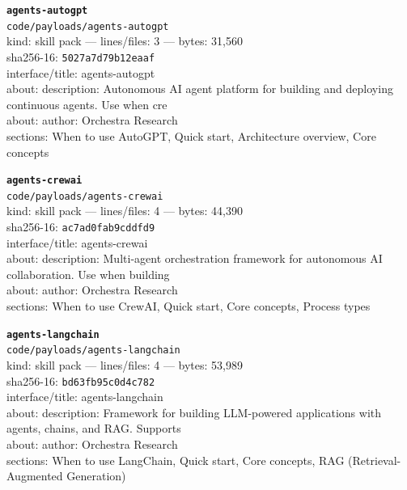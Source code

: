 \noindent\textbf{\texttt{agents-autogpt}}\\
\texttt{code/payloads/agents-autogpt}\\
kind: skill pack --- lines/files: 3 --- bytes: 31,560\\
sha256-16: \texttt{5027a7d79b12eaaf}\\
interface/title: agents-autogpt\\
about: description: Autonomous AI agent platform for building and deploying continuous agents. Use when cre\\
about: author: Orchestra Research\\
sections: When to use AutoGPT, Quick start, Architecture overview, Core concepts\\
\vspace*{6.0pt}

\noindent\textbf{\texttt{agents-crewai}}\\
\texttt{code/payloads/agents-crewai}\\
kind: skill pack --- lines/files: 4 --- bytes: 44,390\\
sha256-16: \texttt{ac7ad0fab9cddfd9}\\
interface/title: agents-crewai\\
about: description: Multi-agent orchestration framework for autonomous AI collaboration. Use when building \\
about: author: Orchestra Research\\
sections: When to use CrewAI, Quick start, Core concepts, Process types\\
\vspace*{6.0pt}

\noindent\textbf{\texttt{agents-langchain}}\\
\texttt{code/payloads/agents-langchain}\\
kind: skill pack --- lines/files: 4 --- bytes: 53,989\\
sha256-16: \texttt{bd63fb95c0d4c782}\\
interface/title: agents-langchain\\
about: description: Framework for building LLM-powered applications with agents, chains, and RAG. Supports \\
about: author: Orchestra Research\\
sections: When to use LangChain, Quick start, Core concepts, RAG (Retrieval-Augmented Generation)\\
\vspace*{6.0pt}

